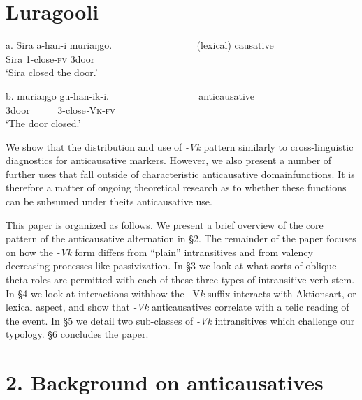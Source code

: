 \documentclass[output=paper]{langsci/langscibook}
\begin{document}
\chapter[  Luragooli]{  Luragooli}
\gll a.  Sira a-han-i       muriaŋgo.~~~ ~~~ ~~~ ~~~ ~~    (lexical) causative\\
       Sira 1-close-\textsc{fv} 3door\\
\glt ‘Sira closed the door.’
\z

\gll b.  muriaŋgo gu-han-ik-i.~~~ ~~~ ~~~ ~~~ ~~~     anticausative\\
       3door ~~~~~3-close\textit{{}-}\textsc{Vk}{}-\textsc{fv}\\
\glt ‘The door closed.’
\z

We show that the distribution and use of \textit{{}-Vk} pattern similarly to cross-linguistic diagnostics for anticausative markers. However, we also present a number of further uses that fall outside of characteristic anticausative domainfunctions. It is therefore a matter of ongoing theoretical research as to whether these functions can be subsumed under theits anticausative use.

  This paper is organized as follows. We present a brief overview of the core pattern of the anticausative alternation in §2. The remainder of the paper focuses on how the \textit{{}-Vk }form differs from “plain” intransitives and from valency decreasing processes like passivization. In §3 we look at what sorts of oblique theta-roles are permitted with each of these three types of intransitive verb stem. In §4 we look at interactions withhow the –V\textit{k }suffix interacts with Aktionsart, or lexical aspect, and show that \textit{{}-Vk} anticausatives correlate with a telic reading of the event. In §5 we detail two sub-classes of \textit{{}-Vk} intransitives which challenge our typology. §6 concludes the paper. 

\chapter{2. Background on anticausatives}
\end{document}
